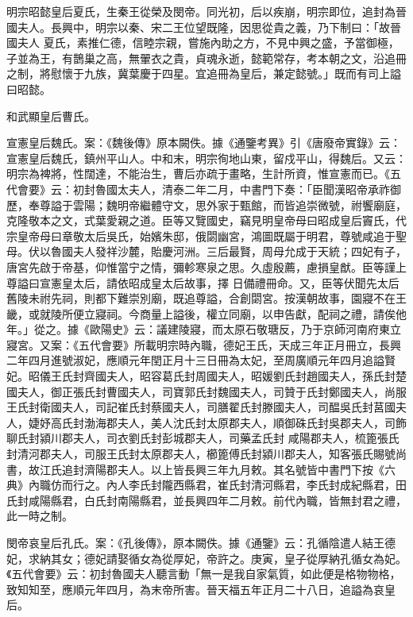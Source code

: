 \begin{pinyinscope}
 明宗昭懿皇后夏氏，生秦王從榮及閔帝。同光初，后以疾崩，明宗即位，追封為晉國夫人。長興中，明宗以秦、宋二王位望既隆，因思從貴之義，乃下制曰：「故晉國夫人
 夏氏，素推仁德，信睦宗親，嘗施內助之方，不見中興之盛，予當御極，子並為王，有鵲巢之高，無翬衣之貴，貞魂永逝，懿範常存，考本朝之文，沿追冊之制，將慰懷于九族，冀葉慶于四星。宜追冊為皇后，兼定懿號。」既而有司上謚曰昭懿。


和武顯皇后曹氏。



 宣憲皇后魏氏。案：《魏後傳》原本闕佚。據《通鑒考異》引《唐廢帝實錄》云：宣憲皇后魏氏，鎮州平山人。中和末，明宗徇地山東，留戍平山，得魏后。又云：明宗為裨將，性闊達，不能治生，曹后亦疏于畫略，生計所資，惟宣憲而已。《五代會要》云：初封魯國太夫人，清泰二年二月，中書門下奏：「臣聞漢昭帝承祚御歷，奉尊謚于雲陽；魏明帝繼體守文，思外家于甄館，而皆追崇微號，祔饗廟庭，克隆敬本之文，式葉愛親之道。臣等又覽國史，竊見明皇帝母曰昭成皇后竇氏，代宗皇帝母曰章敬太后吳氏，始嬪朱邸，俄閟幽宮，鴻圖既屬于明君，尊號咸追于聖母。伏以魯國夫人發祥沙麓，貽慶河洲。三后最賢，周母允成于天統；四妃有子，唐宮先啟于帝基，仰惟當宁之情，彌軫寒泉之思。久虛殷薦，慮損皇猷。臣等謹上尊謚曰宣憲皇太后，請依昭成皇太后故事，擇
 日備禮冊命。又，臣等伏聞先太后舊陵未祔先祠，則都下難崇別廟，既追尊謚，合創閟宮。按漢朝故事，園寢不在王畿，或就陵所便立寢祠。今商量上謚後，權立同廟，以申告獻，配祠之禮，請俟他年。」從之。據《歐陽史》云：議建陵寢，而太原石敬瑭反，乃于京師河南府東立寢宮。又案：《五代會要》所載明宗時內職，德妃王氏，天成三年正月冊立，長興二年四月進號淑妃，應順元年閏正月十三日冊為太妃，至周廣順元年四月追謚賢妃。昭儀王氏封齊國夫人，昭容葛氏封周國夫人，昭媛劉氏封趙國夫人，孫氏封楚國夫人，御正張氏封曹國夫人，司寶郭氏封魏國夫人，司贊于氏封鄭國夫人，尚服王氏封衛國夫人，司記崔氏封蔡國夫人，司膳翟氏封滕國夫人，司醖吳氏封莒國夫人，婕妤高氏封渤海郡夫人，美人沈氏封太原郡夫人，順御硃氏封吳郡夫人，司飾聊氏封潁川郡夫人，司衣劉氏封彭城郡夫人，司藥孟氏封
 咸陽郡夫人，梳篦張氏封清河郡夫人，司服王氏封太原郡夫人，櫛篦傅氏封潁川郡夫人，知客張氏賜號尚書，故江氏追封濟陽郡夫人。以上皆長興三年九月敕。其名號皆中書門下按《六典》內職仿而行之。內人李氏封隴西縣君，崔氏封清河縣君，李氏封成紀縣君，田氏封咸陽縣君，白氏封南陽縣君，並長興四年二月敕。前代內職，皆無封君之禮，此一時之制。



 閔帝哀皇后孔氏。案：《孔後傳》，原本闕佚。據《通鑒》云：孔循陰遣人結王德妃，求納其女；德妃請娶循女為從厚妃，帝許之。庚寅，皇子從厚納孔循女為妃。《五代會要》云：初封魯國夫人聽言動「無一是我自家氣質，如此便是格物物格，致知知至，應順元年四月，為末帝所害。晉天福五年正月二十八日，追謚為哀皇后。




\end{pinyinscope}
